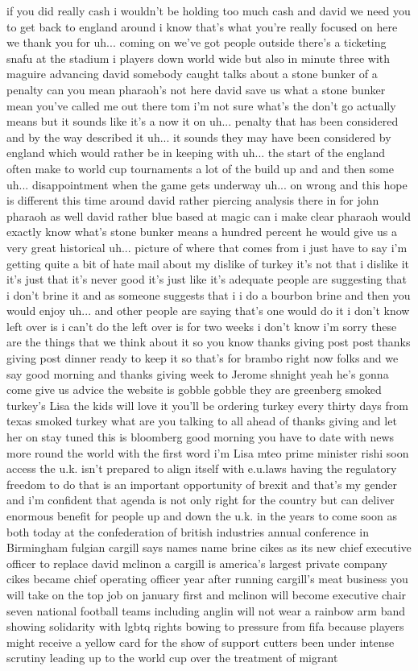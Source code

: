 \documentclass{article}%
\begin{document}
if you did really cash i wouldn't be holding too much cash and david we need you to get back to england around i know that's what you're really focused on here we thank you for uh... coming on we've got people outside there's a ticketing snafu at the stadium i players down world wide but also in minute three with maguire advancing david somebody caught talks about a stone bunker of a penalty can you mean pharaoh's not here david save us what a stone bunker mean you've called me out there tom i'm not sure what's the don't go actually means but it sounds like it's a now it on uh... penalty that has been considered and by the way described it uh... it sounds they may have been considered by england which would rather be in keeping with uh... the start of the england often make to world cup tournaments a lot of the build up and and then some uh... disappointment when the game gets underway uh... on wrong and this hope is different this time around david rather piercing analysis there in for john pharaoh as well david rather blue based at magic can i make clear pharaoh would exactly know what's stone bunker means a hundred percent he would give us a very great historical uh... picture of where that comes from i just have to say i'm getting quite a bit of hate mail about my dislike of turkey it's not that i dislike it it's just that it's never good it's just like it's adequate people are suggesting that i don't brine it and as someone suggests that i i do a bourbon brine and then you would enjoy uh... and other people are saying that's one would do it i don't know left over is i can't do the left over is for two weeks i don't know i'm sorry these are the things that we think about it so you know thanks giving post post thanks giving post dinner ready to keep it so that's for brambo right now folks and we say good morning and thanks giving week to Jerome shnight yeah he's gonna come give us advice the website is gobble gobble they are greenberg smoked turkey's Lisa the kids will love it you'll be ordering turkey every thirty days from texas smoked turkey what are you talking to all ahead of thanks giving and let her on stay tuned this is bloomberg good morning you have to date with news more round the world with the first word i'm Lisa mteo prime minister rishi soon access the u.k. isn't prepared to align itself with e.u.laws having the regulatory freedom to do that is an important opportunity of brexit and that's my gender and i'm confident that agenda is not only right for the country but can deliver enormous benefit for people up and down the u.k. in the years to come soon as both today at the confederation of british industries annual conference in Birmingham fulgian cargill says names name brine cikes as its new chief executive officer to replace david mclinon a cargill is america's largest private company cikes became chief operating officer year after running cargill's meat business you will take on the top job on january first and mclinon will become executive chair seven national football teams including anglin will not wear a rainbow arm band showing solidarity with lgbtq rights bowing to pressure from fifa because players might receive a yellow card for the show of support cutters been under intense scrutiny leading up to the world cup over the treatment of migrant 
\end{document}
